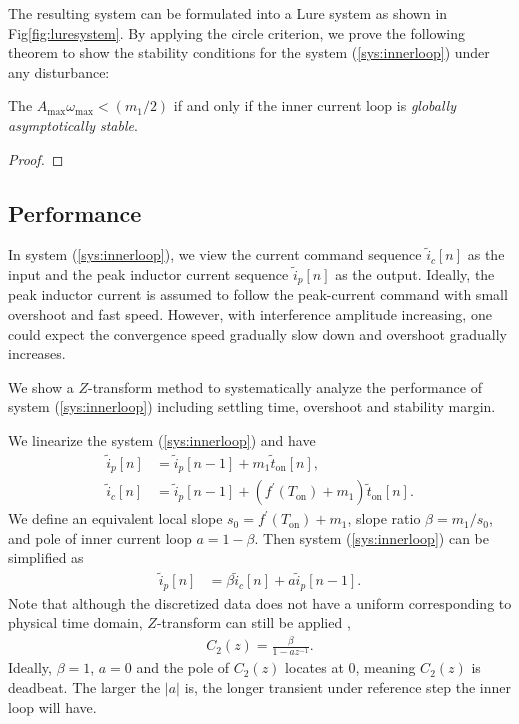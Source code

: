 The resulting system can be formulated into a Lure system as shown in Fig\;\ref{fig:luresystem}. By applying the circle criterion, we prove the following theorem to show the stability conditions for the system (\ref{sys:innerloop}) under any disturbance:
\begin{theorem} \label{th:gloasystab}
The $A_{\text{max}} \omega_{\text{max}} < (m_1/2) $ if and only if the inner current loop is \emph{globally asymptotically stable}.
\end{theorem}
\begin{proof}

\end{proof}

\subsection{Performance}
In system (\ref{sys:innerloop}), we view the current command sequence $\tilde i_c [n]$ as the input and the peak inductor current sequence $\tilde i_p [n]$ as the output. Ideally, the peak inductor current is assumed to follow the peak-current command with small overshoot and fast speed. However, with interference amplitude increasing, one could expect the convergence speed gradually slow down and overshoot gradually increases. 
 
We show a $Z$-transform method to systematically analyze the performance of system (\ref{sys:innerloop}) including settling time, overshoot and stability margin. 

We linearize the system (\ref{sys:innerloop}) and have
\begin{align} \label{sys:linear}
    \tilde i_p[n] &= \tilde i_p[n-1] +  m_1 \tilde t_{\text{on}}[n], \\
    \tilde i_c [n]  & = \tilde i_p[n-1] + (f^{'}(T_{\text{on}}) + m_1)\tilde t_{\text{on}} [n].
\end{align}
 We define an equivalent local slope $s_0 = f^{'}(T_{\text{on}}) + m_1$, slope ratio $\beta = m_1/s_0$, and pole of inner current loop $a = 1-\beta$. Then system (\ref{sys:innerloop}) can be simplified as 
\begin{align}
\tilde i_p[n] &=  \beta \tilde i_c [n] + a \tilde i_p[n-1].
\end{align}
Note that although the discretized data does not have a uniform corresponding to physical time domain, $Z$-transform can still be applied \cite{Cui2018a},
\begin{align}
    C_2(z) = \frac{\beta}{1- a z^{-1}}.
\end{align}
Ideally, $\beta = 1$, $a = 0$ and the pole of $C_2(z)$ locates at 0, meaning $C_2(z)$ is deadbeat. 
The larger the $|a|$ is, the longer transient under reference step the inner loop will have.

